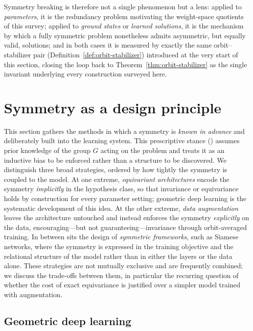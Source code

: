 \documentclass[mathematics,review,submit,moreauthors]{Definitions/mdpi}
\begin{document}
Symmetry breaking is therefore not a single phenomenon but a lens: applied
to \emph{parameters}, it is the redundancy problem motivating the weight-space
quotients of this survey; applied to \emph{ground states} or \emph{learned
solutions}, it is the mechanism by which a fully symmetric problem
nonetheless admits asymmetric, but equally valid, solutions; and in both
cases it is measured by exactly the same orbit--stabilizer pair
(Definition~\ref{def:orbit-stabilizer}) introduced at the very start of this section, closing the loop back to Theorem~\ref{thm:orbit-stabilizer} as the single invariant underlying every construction surveyed here.







\section{Symmetry as a design principle}

This section gathers the methods in which a symmetry is \emph{known in advance} and deliberately built into the learning system.
This prescriptive stance () assumes prior knowledge of the group $G$ acting on the problem and treats it as an inductive bias to be enforced rather than a structure to be discovered.
We distinguish three broad strategies, ordered by how tightly the symmetry is coupled to the model.
At one extreme, \emph{equivariant architectures} encode the symmetry \emph{implicitly} in the hypothesis class, so that invariance or equivariance holds by construction for every parameter setting; geometric deep learning is the systematic development of this idea.
At the other extreme, \emph{data augmentation} leaves the architecture untouched and instead enforces the symmetry \emph{explicitly} on the data, encouraging---but not guaranteeing---invariance through orbit-averaged training.
In between sits the design of \emph{symmetric frameworks}, such as Siamese networks, where the symmetry is expressed in the training objective and the relational structure of the model rather than in either the layers or the data alone.
These strategies are not mutually exclusive and are frequently combined; we discuss the trade-offs between them, in particular the recurring question of whether the cost of exact equivariance is justified over a simpler model trained with augmentation.

\subsection{Geometric deep learning}
\end{document}
